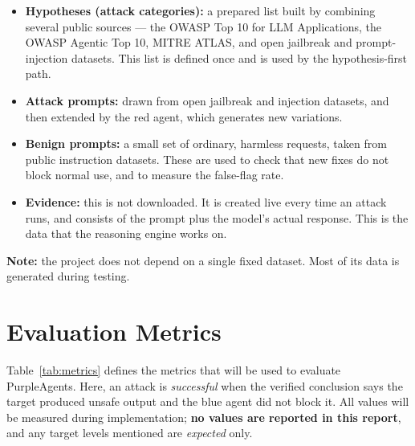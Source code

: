 \begin{itemize}
  \item \textbf{Hypotheses (attack categories):} a prepared list built by
  combining several public sources --- the OWASP Top 10 for LLM Applications, the
  OWASP Agentic Top 10, MITRE ATLAS, and open jailbreak and prompt-injection
  datasets. This list is defined once and is used by the hypothesis-first path.
  \item \textbf{Attack prompts:} drawn from open jailbreak and injection
  datasets, and then extended by the red agent, which generates new variations.
  \item \textbf{Benign prompts:} a small set of ordinary, harmless requests,
  taken from public instruction datasets. These are used to check that new fixes
  do not block normal use, and to measure the false-flag rate.
  \item \textbf{Evidence:} this is not downloaded. It is created live every time
  an attack runs, and consists of the prompt plus the model's actual response.
  This is the data that the reasoning engine works on.
\end{itemize}

\noindent\textbf{Note:} the project does not depend on a single fixed dataset.
Most of its data is generated during testing.

\section{Evaluation Metrics}

Table~\ref{tab:metrics} defines the metrics that will be used to evaluate
PurpleAgents. Here, an attack is \emph{successful} when the verified conclusion
says the target produced unsafe output and the blue agent did not block it. All
values will be measured during implementation; \textbf{no values are reported
in this report}, and any target levels mentioned are \emph{expected} only.

